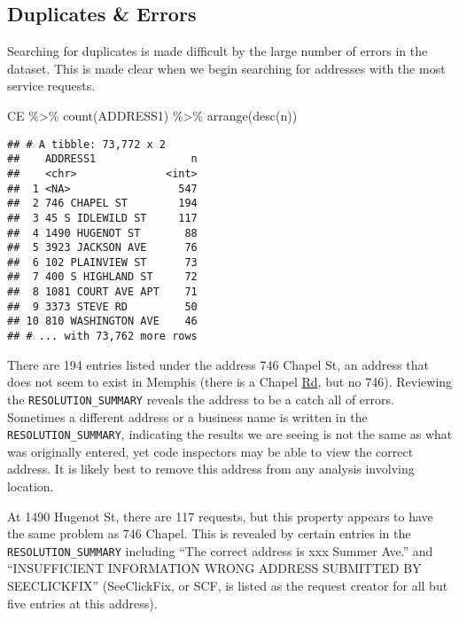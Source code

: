 \documentclass[
]{book}
\newenvironment{Shaded}{\begin{snugshade}}{\end{snugshade}}
\newcommand{\FunctionTok}[1]{\textcolor[rgb]{0.00,0.00,0.00}{#1}}
\newcommand{\NormalTok}[1]{#1}
\newcommand{\SpecialCharTok}[1]{\textcolor[rgb]{0.00,0.00,0.00}{#1}}
\begin{document}
\hypertarget{duplicates-errors}{%
\subsection{Duplicates \& Errors}\label{duplicates-errors}}

Searching for duplicates is made difficult by the large number of errors in the dataset. This is made clear when we begin searching for addresses with the most service requests.

\begin{Shaded}
\begin{Highlighting}[]
\NormalTok{CE }\SpecialCharTok{\%\textgreater{}\%} \FunctionTok{count}\NormalTok{(ADDRESS1) }\SpecialCharTok{\%\textgreater{}\%} \FunctionTok{arrange}\NormalTok{(}\FunctionTok{desc}\NormalTok{(n))}
\end{Highlighting}
\end{Shaded}

\begin{verbatim}
## # A tibble: 73,772 x 2
##    ADDRESS1               n
##    <chr>              <int>
##  1 <NA>                 547
##  2 746 CHAPEL ST        194
##  3 45 S IDLEWILD ST     117
##  4 1490 HUGENOT ST       88
##  5 3923 JACKSON AVE      76
##  6 102 PLAINVIEW ST      73
##  7 400 S HIGHLAND ST     72
##  8 1081 COURT AVE APT    71
##  9 3373 STEVE RD         50
## 10 810 WASHINGTON AVE    46
## # ... with 73,762 more rows
\end{verbatim}

There are 194 entries listed under the address 746 Chapel St, an address that does not seem to exist in Memphis (there is a Chapel \underline{Rd}, but no 746). Reviewing the \texttt{RESOLUTION\_SUMMARY} reveals the address to be a catch all of errors. Sometimes a different address or a business name is written in the \texttt{RESOLUTION\_SUMMARY}, indicating the results we are seeing is not the same as what was originally entered, yet code inspectors may be able to view the correct address. It is likely best to remove this address from any analysis involving location.

At 1490 Hugenot St, there are 117 requests, but this property appears to have the same problem as 746 Chapel. This is revealed by certain entries in the \texttt{RESOLUTION\_SUMMARY} including ``The correct address is xxx Summer Ave.'' and ``INSUFFICIENT INFORMATION WRONG ADDRESS SUBMITTED BY SEECLICKFIX'' (SeeClickFix, or SCF, is listed as the request creator for all but five entries at this address).
\end{document}

